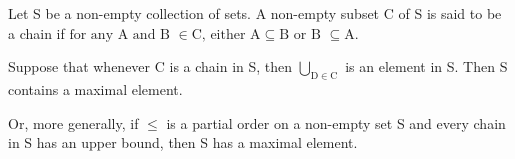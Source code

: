 Let S be a non-empty collection of sets. A non-empty subset C of S is said to
be a chain if $ \text{for any A and B } \in \text{C, either A} \subseteq 
\text{B or B } \subseteq \text{A.} $
\par
Suppose that whenever C is a chain in S, then $ \bigcup_{\mathrm{D} \in \mathrm{C}} $
is an element in S. Then S contains a maximal element.
\par
Or, more generally, if $ \leq $ is a partial order on a non-empty set
S and every chain in S has an upper bound, then S has a maximal element.